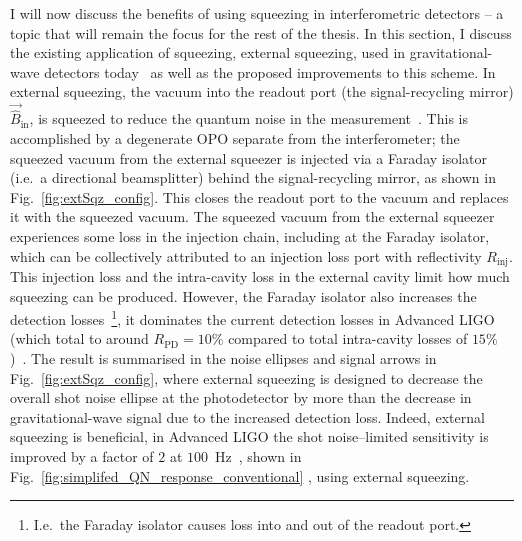 I will now discuss the benefits of using squeezing in interferometric detectors -- a topic that will remain the focus for the rest of the thesis. In this section, I discuss the existing application of squeezing, external squeezing, used in gravitational-wave detectors today~\cite{} as well as the proposed improvements to this scheme. 
In external squeezing, the vacuum into the readout port (the signal-recycling mirror) $\vec{\hat B}_\text{in}$, is squeezed to reduce the quantum noise in the measurement~\cite{}. This is accomplished by a degenerate OPO separate from the interferometer; the squeezed vacuum from the external squeezer is injected via a Faraday isolator~\cite{} (i.e.\ a directional beamsplitter) behind the signal-recycling mirror, as shown in Fig.~\ref{fig:extSqz_config}. This closes the readout port to the vacuum and replaces it with the squeezed vacuum. The squeezed vacuum from the external squeezer experiences some loss in the injection chain, including  at the Faraday isolator, which can be collectively attributed to an injection loss port with reflectivity $R_\text{inj}$. This injection loss and the intra-cavity loss in the external cavity limit how much squeezing can be produced. However, the Faraday isolator also increases the detection losses~\footnote{I.e.\ the Faraday isolator causes loss into and out of the readout port.}, it dominates the current detection losses in Advanced LIGO (which total to around $R_\text{PD}=10\%$ compared to total intra-cavity losses of $15\%$ )~\cite{}. The result is summarised in the noise ellipses and signal arrows in Fig.~\ref{fig:extSqz_config}, where external squeezing is designed to decrease the overall shot noise ellipse at the photodetector by more than the decrease in gravitational-wave signal due to the increased detection loss. Indeed, external squeezing is beneficial, in Advanced LIGO the shot noise--limited sensitivity is improved by a factor of $2$ at $100$~Hz~\cite{tseQuantumEnhancedAdvancedLIGO2019}, shown in Fig.~\ref{fig:simplifed_QN_response_conventional} , using external squeezing.  

